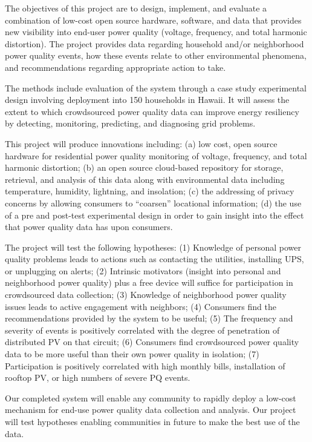 The objectives of this project are to design, implement, and evaluate a combination of low-cost open source hardware, software, and data that provides new visibility into end-user power quality (voltage, frequency, and total harmonic distortion). The project provides data regarding household and/or neighborhood power quality events, how these events relate to other environmental phenomena, and recommendations regarding appropriate action to take.

The methods include evaluation of the system through a case study experimental design involving deployment into 150 households in Hawaii. It will assess the extent to which crowdsourced power quality data can improve energy resiliency by detecting, monitoring, predicting, and diagnosing grid problems.


This project will produce innovations including: (a) low cost, open source hardware for residential power quality monitoring of voltage, frequency, and total harmonic distortion; (b) an open source cloud-based repository for storage, retrieval, and analysis of this data along with environmental data including temperature, humidity, lightning, and insolation; (c) the addressing of privacy concerns by allowing consumers to ``coarsen'' locational information; (d) the use of a pre and post-test experimental design in order to gain insight into the effect that power quality data has upon consumers. 

The project will test the following hypotheses: (1) Knowledge of personal power quality problems leads to actions such as contacting the utilities, installing UPS, or unplugging on alerts; (2) Intrinsic motivators (insight into personal and neighborhood power quality) plus a free device will suffice for participation in crowdsourced data collection; (3) Knowledge of neighborhood power quality issues leads to active engagement with neighbors; (4) Consumers find the recommendations provided by the system to be useful; (5) The frequency and severity of events is positively correlated with the degree of penetration of distributed PV on that circuit; (6) Consumers find crowdsourced power quality data to be more useful than their own power quality in isolation; (7) Participation is positively correlated with high monthly bills, installation of rooftop PV, or high numbers of severe PQ events.

Our completed system will enable any community to rapidly deploy a low-cost mechanism for end-use power quality data collection and analysis. Our project will test hypotheses enabling communities in future to make the best use of the data.





